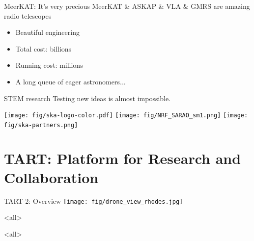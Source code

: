 \documentclass[ignorenonframetext]{beamer}
\begin{document}
% 


\begin{frame}{MeerKAT: It's very precious}
MeerKAT \& ASKAP \& VLA \& GMRS are amazing radio telescopes
\begin{itemize}
\item Beautiful engineering
\item Total cost: billions
\item Running cost: millions
\item A long queue of eager astronomers...
\end{itemize}

\begin{block}{STEM research}
 Testing new ideas is almost impossible.
\end{block}

\texttt{[image: fig/ska-logo-color.pdf]}
\texttt{[image: fig/NRF\_SARAO\_sm1.png]}
\texttt{[image: fig/ska-partners.png]}
\end{frame}

\section{TART: Platform for Research and Collaboration}

\frame{\tableofcontents[currentsection]}

% 
% 



\begin{frame}{TART-2: Overview}
   \texttt{[image: fig/drone\_view\_rhodes.jpg]}
\end{frame}




\mode<all>
{
\begin{frame}[plain]
\end{frame}
}
\mode<all>{\usebackgroundtemplate{}}
\end{document}
